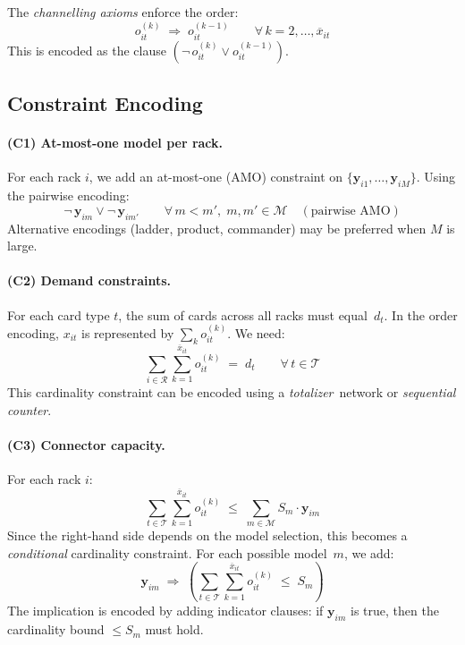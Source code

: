 \documentclass[11pt,a4paper]{article}
\newcommand{\setR}{\mathcal{R}}
\newcommand{\setM}{\mathcal{M}}
\newcommand{\setT}{\mathcal{T}}
\begin{document}
The \emph{channelling axioms} enforce the order:
\begin{equation}\label{eq:sat-order}
  o_{it}^{(k)} \;\Rightarrow\; o_{it}^{(k-1)}
  \qquad \forall\, k = 2, \dots, \overline{x}_{it}
\end{equation}
This is encoded as the clause
$(\neg\, o_{it}^{(k)} \lor o_{it}^{(k-1)})$.

\subsection{Constraint Encoding}

\paragraph{(C1) At-most-one model per rack.}
For each rack $i$, we add an at-most-one (AMO) constraint on
$\{\mathbf{y}_{i1}, \dots, \mathbf{y}_{iM}\}$.
Using the pairwise encoding:
\begin{equation}
  \neg\, \mathbf{y}_{im} \lor \neg\, \mathbf{y}_{im'}
  \qquad \forall\, m < m',\; m, m' \in \setM
  \quad (\text{pairwise AMO})
\end{equation}
Alternative encodings (ladder, product, commander) may be
preferred when $M$ is large.

\paragraph{(C2) Demand constraints.}
For each card type $t$, the sum of cards across all racks must
equal~$d_t$. In the order encoding, $x_{it}$ is represented by
$\sum_k o_{it}^{(k)}$.  We need:
\begin{equation}
  \sum_{i \in \setR} \sum_{k=1}^{\overline{x}_{it}} o_{it}^{(k)}
  \;=\; d_t
  \qquad \forall\, t \in \setT
\end{equation}
This cardinality constraint can be encoded using a
\emph{totalizer}~network or \emph{sequential counter}.

\paragraph{(C3) Connector capacity.}
For each rack $i$:
\begin{equation}
  \sum_{t \in \setT} \sum_{k=1}^{\overline{x}_{it}} o_{it}^{(k)}
  \;\le\;
  \sum_{m \in \setM} S_m \cdot \mathbf{y}_{im}
\end{equation}
Since the right-hand side depends on the model selection,
this becomes a \emph{conditional} cardinality constraint.
For each possible model~$m$, we add:
\begin{equation}\label{eq:sat-conn-m}
  \mathbf{y}_{im}
  \;\Rightarrow\;
  \left(
    \sum_{t \in \setT} \sum_{k=1}^{\overline{x}_{it}} o_{it}^{(k)}
    \;\le\; S_m
  \right)
\end{equation}
The implication is encoded by adding indicator clauses:
if $\mathbf{y}_{im}$ is true, then the cardinality bound
$\le S_m$ must hold.
\end{document}
